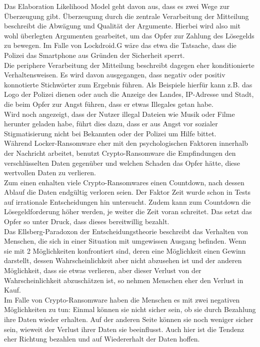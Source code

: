 Das Elaboration Likelihood Model geht davon aus, dass es zwei Wege zur Überzeugung gibt. Überzeugung durch die zentrale Verarbeitung der Mitteilung beschreibt die Abwägung und Qualität der Argumente. Hierbei wird also mit wohl überlegten Argumenten gearbeitet, um das Opfer zur Zahlung des Lösegelds zu bewegen. Im Falle von \glqq Lockdroid.G\grqq{} wäre das etwa die Tatsache, dass die Polizei das Smartphone \glqq aus Gründen der Sicherheit\grqq{} sperrt.\\
Die periphere Verarbeitung der Mitteilung beschreibt dagegen eher konditionierte Verhaltensweisen. Es wird davon ausgegangen, dass negativ oder positiv konnotierte Stichwörter zum Ergebnis führen. Als Beispiele hierfür kann z.B. das Logo der Polizei dienen oder auch die Anzeige des Landes, IP-Adresse und Stadt, die beim Opfer zur Angst führen, dass er etwas Illegales getan habe. \\

Wird noch angezeigt, dass der Nutzer illegal Dateien wie Musik oder Filme herunter geladen habe, führt dies dazu, dass er aus Angst vor sozialer Stigmatisierung nicht bei Bekannten oder der Polizei um Hilfe bittet.\\

Während Locker-Ransomware eher mit den psychologischen Faktoren innerhalb der Nachricht arbeitet, benutzt Crypto-Ransomware die Empfindungen den verschlüsselten Daten gegenüber und welchen Schaden das Opfer hätte, diese wertvollen Daten zu verlieren.\\

Zum einen enhalten viele Crypto-Ransomwares einen Countdown, nach dessen Ablauf die Daten endgültig verloren seien. Der Faktor Zeit wurde schon in Tests auf irrationale Entscheidungen hin untersucht. Zudem kann zum Countdown die Lösegeldforderung höher werden, je weiter die Zeit voran schreitet. Das setzt das Opfer so unter Druck, dass dieses bereitwillig bezahlt.\\
Das Ellsberg-Paradoxon der Entscheidungstheorie beschreibt das Verhalten von Menschen, die sich in einer Situation mit umgewissen Ausgang befinden. Wenn sie mit 2 Möglichkeiten konfrontiert sind, deren eine Möglichkeit einen Gewinn darstellt, dessen Wahrscheinlichkeit aber nicht abzusehen ist und der anderen Möglichkeit, dass sie etwas verlieren, aber dieser Verlust von der Wahrscheinlichkeit abzuschätzen ist, so nehmen Menschen eher den Verlust in Kauf.\\
Im Falle von Crypto-Ransomware haben die Menschen es mit zwei negativen Möglichkeiten zu tun: Einmal können sie nicht sicher sein, ob sie durch Bezahlung ihre Daten wieder erhalten. Auf der anderen Seite können sie noch weniger sicher sein, wieweit der Verlust ihrer Daten sie beeinflusst. Auch hier ist die Tendenz eher Richtung bezahlen und auf Wiedererhalt der Daten hoffen.

